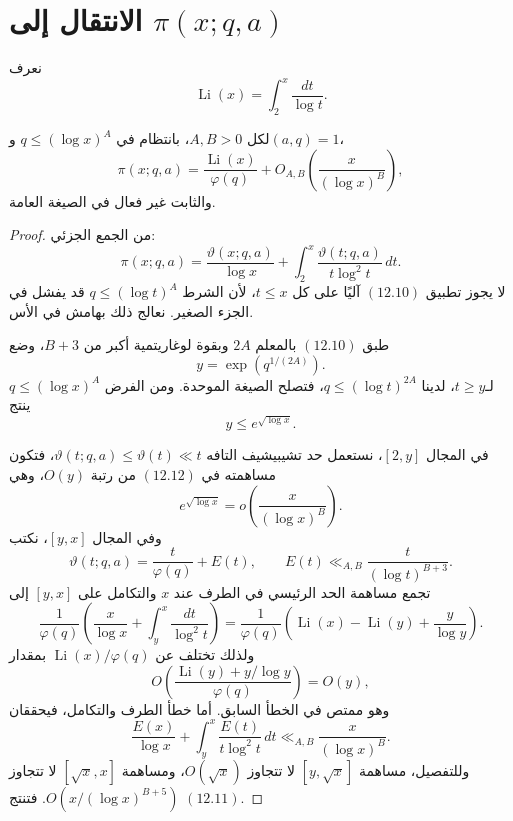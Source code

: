 \section{الانتقال إلى \(\pi(x;q,a)\)}

نعرف
\[
\operatorname{Li}(x)=\int_2^x\frac{dt}{\log t}.
\]

\begin{corollary}
\label{cor:chapter12-siegel-walfisz-pi}
\provedhere
لكل \(A,B>0\)، بانتظام في \(q\le(\log x)^A\) و\((a,q)=1\)،
\[
\pi(x;q,a)
=
\frac{\operatorname{Li}(x)}{\varphi(q)}
+O_{A,B}\!\left(\frac{x}{(\log x)^B}\right),
\tag{12.11}
\]
والثابت غير فعال في الصيغة العامة.
\end{corollary}

\begin{proof}
من الجمع الجزئي:
\[
\pi(x;q,a)
=
\frac{\vartheta(x;q,a)}{\log x}
+
\int_2^x\frac{\vartheta(t;q,a)}{t\log^2t}\,dt.
\tag{12.12}
\]
لا يجوز تطبيق \((12.10)\) آليًا على كل \(t\le x\)، لأن الشرط
\(q\le(\log t)^A\) قد يفشل في الجزء الصغير. نعالج ذلك بهامش في الأس.

طبق \((12.10)\) بالمعلم \(2A\) وبقوة لوغاريتمية أكبر من \(B+3\)، وضع
\[
y=\exp\!\left(q^{1/(2A)}\right).
\]
لـ\(t\ge y\)، لدينا \(q\le(\log t)^{2A}\)، فتصلح الصيغة الموحدة. ومن
الفرض \(q\le(\log x)^A\) ينتج
\[
y\le e^{\sqrt{\log x}}.
\]

في المجال \([2,y]\)، نستعمل حد تشيبيشيف التافه
\(\vartheta(t;q,a)\le\vartheta(t)\ll t\)، فتكون مساهمته في \((12.12)\)
من رتبة \(O(y)\)، وهي
\[
e^{\sqrt{\log x}}=o\!\left(\frac{x}{(\log x)^B}\right).
\]
وفي المجال \([y,x]\)، نكتب
\[
\vartheta(t;q,a)=\frac{t}{\varphi(q)}+E(t),
\qquad
E(t)\ll_{A,B}\frac{t}{(\log t)^{B+3}}.
\]
تجمع مساهمة الحد الرئيسي في الطرف عند \(x\) والتكامل على \([y,x]\) إلى
\[
\frac1{\varphi(q)}
\left(
\frac{x}{\log x}
+\int_y^x\frac{dt}{\log^2t}
\right)
=
\frac1{\varphi(q)}
\left(
\operatorname{Li}(x)-\operatorname{Li}(y)+\frac{y}{\log y}
\right).
\]
ولذلك تختلف عن \(\operatorname{Li}(x)/\varphi(q)\) بمقدار
\[
O\!\left(\frac{\operatorname{Li}(y)+y/\log y}{\varphi(q)}\right)
=O(y),
\]
وهو ممتص في الخطأ السابق. أما خطأ الطرف والتكامل، فيحققان
\[
\frac{E(x)}{\log x}
+
\int_y^x\frac{E(t)}{t\log^2t}\,dt
\ll_{A,B}
\frac{x}{(\log x)^B}.
\]
وللتفصيل، مساهمة \([y,\sqrt x]\) لا تتجاوز \(O(\sqrt x)\)، ومساهمة
\([\sqrt x,x]\) لا تتجاوز \(O(x/(\log x)^{B+5})\). فتنتج \((12.11)\).
\end{proof}


